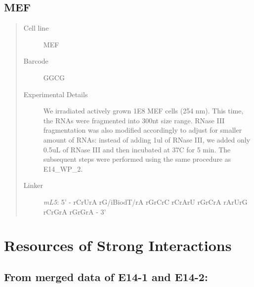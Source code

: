 \documentclass[letterpaper,10pt,english]{sphinxmanual}
\begin{document}
\subsection{MEF}
\label{Data_Resources:mef}\begin{quote}\begin{description}
\item[{Cell line}] \leavevmode
MEF

\item[{Barcode}] \leavevmode
GGCG

\item[{Experimental Details}] \leavevmode
We irradiated actively grown 1E8 MEF cells (254 nm). This time, the RNAs
were fragmented into 300nt size range. RNase III fragmentation was also modified accordingly
to adjust for smaller amount of RNAs: instead of adding 1ul of RNase III, we added only 0.5uL
of RNase III and then incubated at 37C for 5 min. The subsequent steps were performed using
the same procedure as E14\_WP\_2.

\item[{Linker}] \leavevmode
\emph{mL5}: 5' - rCrUrA rG/iBiodT/rA rGrCrC rCrArU rGrCrA rArUrG rCrGrA rGrGrA - 3'

\end{description}\end{quote}


\section{Resources of Strong Interactions}
\label{Data_Resources:resources-of-strong-interactions}

\subsection{From merged data of E14-1 and E14-2:}
\label{Data_Resources:from-merged-data-of-e14-1-and-e14-2}
\end{document}
